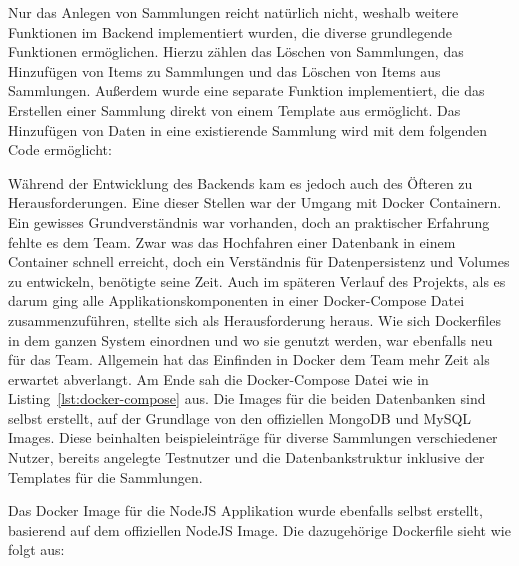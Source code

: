 Nur das Anlegen von Sammlungen reicht natürlich nicht, weshalb weitere Funktionen im Backend implementiert wurden, die diverse grundlegende Funktionen ermöglichen.
Hierzu zählen das Löschen von Sammlungen, das Hinzufügen von Items zu Sammlungen und das Löschen von Items aus Sammlungen.
Außerdem wurde eine separate Funktion implementiert, die das Erstellen einer Sammlung direkt von einem Template aus ermöglicht.
Das Hinzufügen von Daten in eine existierende Sammlung wird mit dem folgenden Code ermöglicht:
\vspace{1em}

\vspace{1em}
Während der Entwicklung des Backends kam es jedoch auch des Öfteren zu Herausforderungen.
Eine dieser Stellen war der Umgang mit Docker Containern.
Ein gewisses Grundverständnis war vorhanden, doch an praktischer Erfahrung fehlte es dem Team.
Zwar was das Hochfahren einer Datenbank in einem Container schnell erreicht, doch ein Verständnis für Datenpersistenz und Volumes zu entwickeln, benötigte seine Zeit.
Auch im späteren Verlauf des Projekts, als es darum ging alle Applikationskomponenten in einer Docker-Compose Datei zusammenzuführen, stellte sich als Herausforderung heraus.
Wie sich Dockerfiles in dem ganzen System einordnen und wo sie genutzt werden, war ebenfalls neu für das Team.
Allgemein hat das Einfinden in Docker dem Team mehr Zeit als erwartet abverlangt.
Am Ende sah die Docker-Compose Datei wie in Listing~\ref{lst:docker-compose} aus.
Die Images für die beiden Datenbanken sind selbst erstellt, auf der Grundlage von den offiziellen MongoDB und MySQL Images.
Diese beinhalten beispieleinträge für diverse Sammlungen verschiedener Nutzer, bereits angelegte Testnutzer und die Datenbankstruktur inklusive der Templates für die Sammlungen.

\vspace{1em}

\vspace{1em}

Das Docker Image für die NodeJS Applikation wurde ebenfalls selbst erstellt, basierend auf dem offiziellen NodeJS Image.
Die dazugehörige Dockerfile sieht wie folgt aus:

\vspace{1em}

\vspace{1em}

